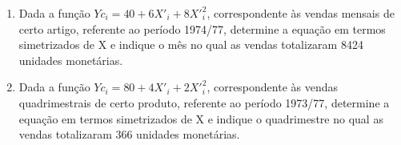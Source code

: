 \begin{enumerate}[resume]
\item Dada a função $Yc_{i} = 40 + 6X'_{i} + 8X'^{2}_{i}$, correspondente às vendas mensais de certo artigo, referente ao período 1974/77, determine a equação em termos simetrizados de X e indique o mês no qual as vendas totalizaram 8424 unidades monetárias.

\item Dada a função $Yc_{i} = 80 + 4X'_{i} + 2X'^{2}_{i}$, correspondente às vendas quadrimestrais de certo produto, referente ao período 1973/77, determine a equação em termos simetrizados de X e indique o quadrimestre no qual as vendas totalizaram 366 unidades monetárias.

\end{enumerate}